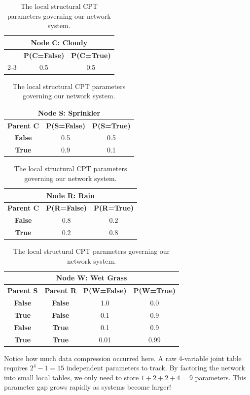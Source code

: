 \documentclass{article}
\begin{document}
\begin{table}[H]
\centering
\small
\begin{tabular}{|c|cc|}
\hline
\multicolumn{3}{|c|}{\textbf{Node C: Cloudy}} \\ \hline
& \textbf{P(C=False)} & \textbf{P(C=True)} \\ \cline{2-3} 
& 0.5 & 0.5 \\ \hline
\end{tabular}
\quad
\begin{tabular}{|c|cc|}
\hline
\multicolumn{3}{|c|}{\textbf{Node S: Sprinkler}} \\ \hline
\textbf{Parent C} & \textbf{P(S=False)} & \textbf{P(S=True)} \\ \hline
\textbf{False} & 0.5 & 0.5 \\
\textbf{True} & 0.9 & 0.1 \\ \hline
\end{tabular}
\vspace{0.3cm}

\begin{tabular}{|c|cc|}
\hline
\multicolumn{3}{|c|}{\textbf{Node R: Rain}} \\ \hline
\textbf{Parent C} & \textbf{P(R=False)} & \textbf{P(R=True)} \\ \hline
\textbf{False} & 0.8 & 0.2 \\
\textbf{True} & 0.2 & 0.8 \\ \hline
\end{tabular}
\quad
\begin{tabular}{|cc|cc|}
\hline
\multicolumn{4}{|c|}{\textbf{Node W: Wet Grass}} \\ \hline
\textbf{Parent S} & \textbf{Parent R} & \textbf{P(W=False)} & \textbf{P(W=True)} \\ \hline
\textbf{False} & \textbf{False} & 1.0 & 0.0 \\
\textbf{True} & \textbf{False} & 0.1 & 0.9 \\
\textbf{False} & \textbf{True} & 0.1 & 0.9 \\
\textbf{True} & \textbf{True} & 0.01 & 0.99 \\ \hline
\end{tabular}
\caption{The local structural CPT parameters governing our network system.}
\label{tab:cpts}
\end{table}

Notice how much data compression occurred here. A raw 4-variable joint table requires $2^4 - 1 = 15$ independent parameters to track. By factoring the network into small local tables, we only need to store $1 + 2 + 2 + 4 = 9$ parameters. This parameter gap grows rapidly as systems become larger!
\end{document}
